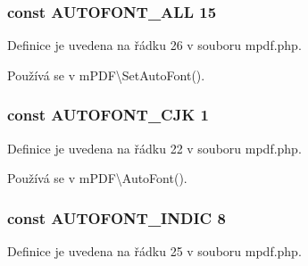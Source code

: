 \hypertarget{mpdf_8php_a7610702a00ad8f89228d9bcd7d2402e3}{
\subsubsection[{A\-U\-T\-O\-F\-O\-N\-T\-\_\-\-A\-L\-L}]{\setlength{\rightskip}{0pt plus 5cm}const A\-U\-T\-O\-F\-O\-N\-T\-\_\-\-A\-L\-L 15}}\label{mpdf_8php_a7610702a00ad8f89228d9bcd7d2402e3}


Definice je uvedena na řádku 26 v souboru mpdf.\-php.



Používá se v m\-P\-D\-F\textbackslash{}\-Set\-Auto\-Font().

\hypertarget{mpdf_8php_af3d2249ee24b8699ac31e465e2e91369}{
\subsubsection[{A\-U\-T\-O\-F\-O\-N\-T\-\_\-\-C\-J\-K}]{\setlength{\rightskip}{0pt plus 5cm}const A\-U\-T\-O\-F\-O\-N\-T\-\_\-\-C\-J\-K 1}}\label{mpdf_8php_af3d2249ee24b8699ac31e465e2e91369}


Definice je uvedena na řádku 22 v souboru mpdf.\-php.



Používá se v m\-P\-D\-F\textbackslash{}\-Auto\-Font().

\hypertarget{mpdf_8php_a77d04295862453c15c32c84b67c1616d}{
\subsubsection[{A\-U\-T\-O\-F\-O\-N\-T\-\_\-\-I\-N\-D\-I\-C}]{\setlength{\rightskip}{0pt plus 5cm}const A\-U\-T\-O\-F\-O\-N\-T\-\_\-\-I\-N\-D\-I\-C 8}}\label{mpdf_8php_a77d04295862453c15c32c84b67c1616d}


Definice je uvedena na řádku 25 v souboru mpdf.\-php.



